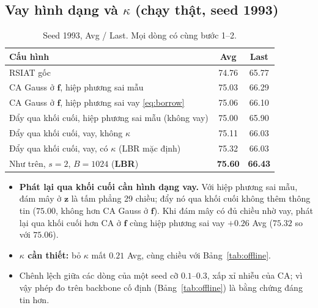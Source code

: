 \documentclass[11pt]{article}
\newcommand{\vf}{\mathbf{f}}
\newcommand{\vz}{\mathbf{z}}
\begin{document}
\subsection{Vay hình dạng và $\kappa$ (chạy thật, seed 1993)}
\begin{table}[H]
\centering\small
\caption{Seed 1993, Avg / Last. Mọi dòng có cùng bước 1--2.}
\label{tab:abl1}
\begin{tabular}{lcc}
\toprule
Cấu hình & Avg & Last\\
\midrule
RSIAT gốc & 74.76 & 65.77\\
CA Gauss ở $\vf$, hiệp phương sai mẫu & 75.03 & 66.29\\
CA Gauss ở $\vf$, hiệp phương sai vay \eqref{eq:borrow} & 75.06 & 66.10\\
Đẩy qua khối cuối, hiệp phương sai mẫu (không vay) & 75.00 & 65.90\\
Đẩy qua khối cuối, vay, không $\kappa$ & 75.11 & 66.03\\
Đẩy qua khối cuối, vay, có $\kappa$ (LBR mặc định) & 75.32 & 66.03\\
Như trên, $s{=}2$, $B{=}1024$ (\textbf{LBR}) & \textbf{75.60} & \textbf{66.43}\\
\bottomrule
\end{tabular}
\end{table}
\begin{itemize}
\item \textbf{Phát lại qua khối cuối cần hình dạng vay.} Với hiệp phương sai mẫu, đám mây ở $\vz$ là tấm phẳng 29 chiều;
      đẩy nó qua khối cuối không thêm thông tin ($75.00$, không hơn CA Gauss ở $\vf$). Khi đám mây có đủ chiều nhờ vay,
      phát lại qua khối cuối hơn CA ở $\vf$ cùng hiệp phương sai vay $+0.26$ Avg ($75.32$ so với $75.06$).
\item \textbf{$\kappa$ cần thiết:} bỏ $\kappa$ mất $0.21$ Avg, cùng chiều với Bảng~\ref{tab:offline}.
\item Chênh lệch giữa các dòng của một seed cỡ $0.1$--$0.3$, xấp xỉ nhiễu của CA; vì vậy phép đo trên backbone cố định
      (Bảng~\ref{tab:offline}) là bằng chứng đáng tin hơn.
\end{itemize}
\end{document}
